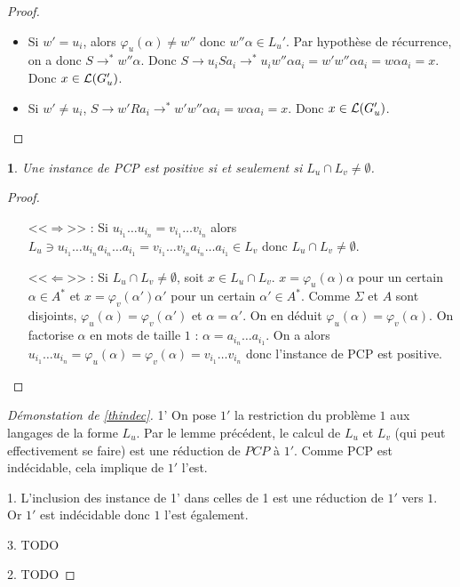 \documentclass[10pt,a4paper,notitlepage]{article}
\theoremstyle{plain}
\theoremstyle{definition}
\theoremstyle{definition}
\theoremstyle{remark}
\theoremstyle{remark}
\theoremstyle{plain}
\newtheorem{lem}[thm]{\protect\lemmaname}
\theoremstyle{plain}
\theoremstyle{plain}
\theoremstyle{remark}
\providecommand{\lemmaname}{Lemme}
\begin{document}
\begin{proof}
\begin{itemize}
\begin{itemize}
\begin{itemize}
				\begin{itemize}
					\item Si $w'=u_i$, alors $\varphi_u(\alpha)\not=w''$ donc $w''\alpha\in L_u'$. Par hypothèse de récurrence, on a donc $S\to^* w''\alpha$. Donc $S\to u_iSa_i\to^*u_i w''\alpha a_i=w'w''\alpha a_i=w\alpha a_i = x$. Donc $x\in \mathcal{L}(G_u')$.
					\item Si $w'\not= u_i$, $S\to w'Ra_i\to^* w'w''\alpha a_i=w\alpha a_i = x$. Donc $x\in \mathcal{L}(G_u')$.
				\end{itemize}
			\end{itemize}
		\end{itemize}
	\end{itemize}
\end{proof}

\begin{lem}
	Une instance de PCP est positive si et seulement si $L_u\cap L_v\not= \emptyset$.
\end{lem}

\begin{proof}
	\begin{itemize}
		\item[<<$\Rightarrow$>>] : Si $u_{i_1}\dots u_{i_n}=v_{i_1}\dots v_{i_n}$ alors $L_u\ni u_{i_1}\dots u_{i_n}a_{i_n}\dots a_{i_1}=v_{i_1}\dots v_{i_n}a_{i_n}\dots a_{i_1}\in L_v$ donc $L_u\cap L_v \not= \emptyset$.
		\item[<<$\Leftarrow$>>] : Si $L_u\cap L_v \not= \emptyset$, soit $x\in L_u\cap L_v$. $x = \varphi_u(\alpha)\alpha$ pour un certain $\alpha \in A^*$ et $x = \varphi_v(\alpha')\alpha'$ pour un certain $\alpha'\in A^*$. Comme $\Sigma$ et $A$ sont disjoints, $\varphi_u(\alpha)=\varphi_v(\alpha')$ et $\alpha=\alpha'$. On en déduit $\varphi_u(\alpha)=\varphi_v(\alpha)$. On factorise $\alpha$ en mots de taille $1$ : $\alpha = a_{i_n}\dots a_{i_1}$. On a alors $u_{i_1}\dots u_{i_n}=\varphi_u(\alpha)=\varphi_v(\alpha)=v_{i_1}\dots v_{i_n}$ donc l'instance de PCP est positive.
	\end{itemize}
\end{proof}

\begin{proof}[Démonstation de \ref{thindec}]
	\item[1'] On pose $1'$ la restriction du problème $1$ aux langages de la forme $L_u$. Par le lemme précédent, le calcul de $L_u$ et $L_v$ (qui peut effectivement se faire) est une réduction de $PCP$ à $1'$. Comme PCP est indécidable, cela implique de $1'$ l'est.
	
	\item[1.] L'inclusion des instance de 1' dans celles de 1 est une réduction de $1'$ vers $1$. Or $1'$ est indécidable donc $1$ l'est également.
	
	\item[3.] TODO
	
	\item[2.] TODO
\end{proof}
\end{document}
